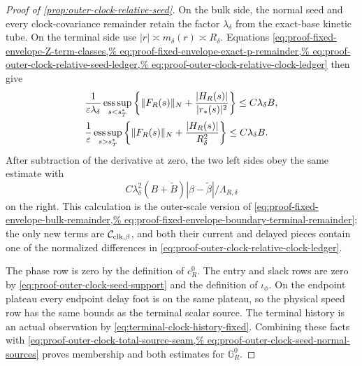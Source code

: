 \begin{proof}[Proof of \cref{prop:outer-clock-relative-seed}]
On the bulk side, the normal seed and every clock-covariance remainder
retain the factor \(\lambda_\delta\) from the exact-base kinetic tube.
On the terminal side use
\(|r|\asymp m_\delta(r)\asymp R_\delta\).
Equations
\cref{eq:proof-fixed-envelope-Z-term-classes,%
eq:proof-fixed-envelope-exact-p-remainder,%
eq:proof-outer-clock-relative-seed-ledger,%
eq:proof-outer-clock-relative-clock-ledger}
then give
\begin{align}
 &\frac1{\varepsilon\lambda_\delta}
 \operatorname*{ess\,sup}_{s<s_T^*}
 \left\{\|F_R(s)\|_N+\frac{|H_R(s)|}{|r_*(s)|^2}\right\}
 \le C\lambda_\delta B,\notag\\
 &\frac1\varepsilon
 \operatorname*{ess\,sup}_{s>s_T^*}
 \left\{\|F_R(s)\|_N+\frac{|H_R(s)|}{R_\delta^2}\right\}
 \le C\lambda_\delta B.                         \label{eq:proof-outer-clock-seed-normal-sources}
\end{align}
After subtraction of the derivative at zero, the two left sides obey the
same estimate with
\[
 C\lambda_\delta^2(B+\widetilde B)
       |\beta-\widetilde\beta|/\Lambda_{R,\delta}
\]
on the right.  This calculation is the outer-scale version of
\cref{eq:proof-fixed-envelope-bulk-remainder,%
eq:proof-fixed-envelope-boundary-terminal-remainder}; the only new
terms are \(\mathcal C_{\rm clk,\beta}\), and both their current and
delayed pieces contain one of the normalized differences in
\cref{eq:proof-outer-clock-relative-clock-ledger}.

The phase row is zero by the definition of \(c_R^0\).  The entry and
slack rows are zero by
\cref{eq:proof-outer-clock-seed-support} and the definition of
\(\iota_\phi\).  On the endpoint plateau every endpoint delay foot is on
the same plateau, so the physical speed row has the same bounds as the
terminal scalar source.  The terminal history is an actual observation
by \cref{eq:terminal-clock-history-fixed}.  Combining these facts with
\cref{eq:proof-outer-clock-total-source-seam,%
eq:proof-outer-clock-seed-normal-sources} proves membership and both
estimates for \(\mathbb G_R^0\).
\end{proof}

